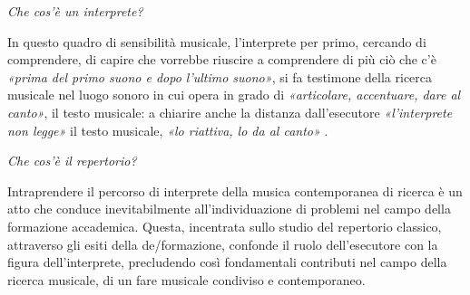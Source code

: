 \documentclass{gs-adonis}
\begin{document}
\emph{Che cos'è un interprete?}

In questo quadro di sensibilità musicale, l'interprete per primo, cercando di
comprendere, di capire che vorrebbe riuscire a comprendere di più ciò che c'è
\emph{«prima del primo suono e dopo l'ultimo suono»}, si fa testimone della
ricerca musicale nel luogo sonoro in cui opera in grado di
\emph{«articolare, accentuare, dare al canto»}, il testo musicale: a chiarire
anche la distanza dall'esecutore \emph{«l'interprete non legge»} il testo
musicale, \emph{«lo riattiva, lo da al canto»} \cite{Cacciari1995}.

\emph{Che cos'è il repertorio?}

Intraprendere il percorso di interprete della musica contemporanea di ricerca è
un atto che conduce inevitabilmente all'individuazione di problemi nel campo
della formazione accademica. Questa, incentrata sullo studio del repertorio
classico, attraverso gli esiti della de/formazione, confonde il ruolo
dell'esecutore con la figura dell'interprete, %
precludendo così fondamentali contributi nel campo della ricerca musicale, di un
fare musicale condiviso e contemporaneo.


%

%
\end{document}
